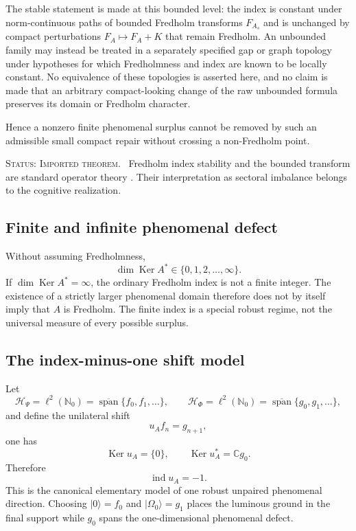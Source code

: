 \documentclass[11pt,reqno]{scrartcl}
\newcommand{\CC}{\mathbb C}
\newcommand{\NN}{\mathbb N}
\newcommand{\scrHP}{\mathscr H_{\Psi}}
\newcommand{\scrHF}{\mathscr H_{\Phi}}
\newcommand{\ket}[1]{\lvert #1\rangle}
\DeclareMathOperator{\Ker}{Ker}
\DeclareMathOperator{\Span}{span}
\DeclareMathOperator{\ind}{ind}
\newcommand{\statuslabel}[1]{\par\smallskip\noindent\textsc{Status: #1.}\ }
\theoremstyle{plain}
\theoremstyle{definition}
\theoremstyle{remark}
\begin{document}
The stable statement is made at this bounded level: the index is constant
under norm-continuous paths of bounded Fredholm transforms $F_{A_s}$ and is
unchanged by compact perturbations $F_A\mapsto F_A+K$ that remain Fredholm.
An unbounded family may instead be treated in a separately specified gap or
graph topology under hypotheses for which Fredholmness and index are known to
be locally constant.  No equivalence of these topologies is asserted here, and
no claim is made that an arbitrary compact-looking change of the raw unbounded
formula preserves its domain or Fredholm character.

Hence a nonzero finite phenomenal surplus cannot be removed by such an
admissible small compact repair without crossing a non-Fredholm point.

\statuslabel{Imported theorem} Fredholm index stability and the bounded
transform are standard operator theory \cite{Kato,ReedSimon}.  Their
interpretation as sectoral imbalance belongs to the cognitive realization.

\subsection{Finite and infinite phenomenal defect}

Without assuming Fredholmness,
\begin{equation}
  \boxed{
  \dim\Ker A^*\in\{0,1,2,\ldots,\infty\}.}
  \label{eq:phenomenal-excess-multiplicity}
\end{equation}
If $\dim\Ker A^*=\infty$, the ordinary Fredholm index is not a finite integer.
The existence of a strictly larger phenomenal domain therefore does not by
itself imply that $A$ is Fredholm.  The finite index is a special robust
regime, not the universal measure of every possible surplus.

\subsection{The index-minus-one shift model}

Let
\begin{equation}
  \scrHP=\ell^2(\NN_0)=\overline{\Span}\{f_0,f_1,\ldots\},
  \qquad
  \scrHF=\ell^2(\NN_0)=\overline{\Span}\{g_0,g_1,\ldots\},
\end{equation}
and define the unilateral shift
\begin{equation}
  u_A f_n=g_{n+1},
  \label{eq:unilateral-shift-example}
\end{equation}
one has
\begin{equation}
  \Ker u_A=\{0\},
  \qquad
  \Ker u_A^*=\CC g_0.
\end{equation}
Therefore
\begin{equation}
  \boxed{\ind u_A=-1.}
  \label{eq:shift-index-minus-one}
\end{equation}
This is the canonical elementary model of one robust unpaired phenomenal
direction.  Choosing $\ket0=f_0$ and $\ket{\Omega_0}=g_1$ places the luminous
ground in the final support while $g_0$ spans the one-dimensional phenomenal
defect.
\end{document}
